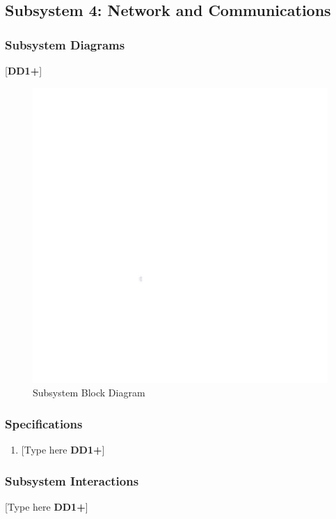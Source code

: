 \clearpage
\subsection{Subsystem 4: Network and Communications}

\subsubsection{Subsystem Diagrams}
[\textbf{DD1+}]
\begin{figure}[h]
    \centering
    \includegraphics[width=16cm]{images/white.png} %
    \caption{Subsystem Block Diagram}
\end{figure} %

\subsubsection{Specifications}
\begin{enumerate}
    \item {[Type here \textbf{DD1+}]}
\end{enumerate}

\subsubsection{Subsystem Interactions}
[Type here \textbf{DD1+}]

